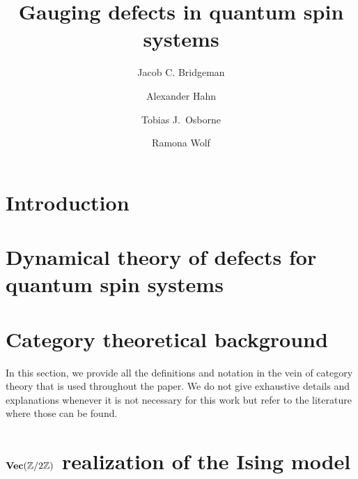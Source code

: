 

\title{Gauging defects in quantum spin systems}
\author{Jacob C. Bridgeman}
\author{Alexander Hahn}
\author{Tobias J.\ Osborne}
\author{Ramona Wolf}

\address{Perimeter Institute for Theoretical Physics, Waterloo, Ontario, Canada}
\address{Institut für Theoretische Physik, Leibniz Universität Hannover, Hannover, Germany}


\newcommand{\jcb}[1]{\textcolor{blue}{#1}}



\maketitle

\begin{abstract}
	
\end{abstract}

\tableofcontents

\section{Introduction}


\section{Dynamical theory of defects for quantum spin systems}



\section{Category theoretical background}\label{S:defs}
In this section, we provide all the definitions and notation in the vein of category theory that is used throughout the paper. We do not give exhaustive details and explanations whenever it is not necessary for this work but refer to the literature where those can be found.







\section{$\textbf{Vec}(\mathbb{Z}/2\mathbb{Z})$ realization of the Ising model}



